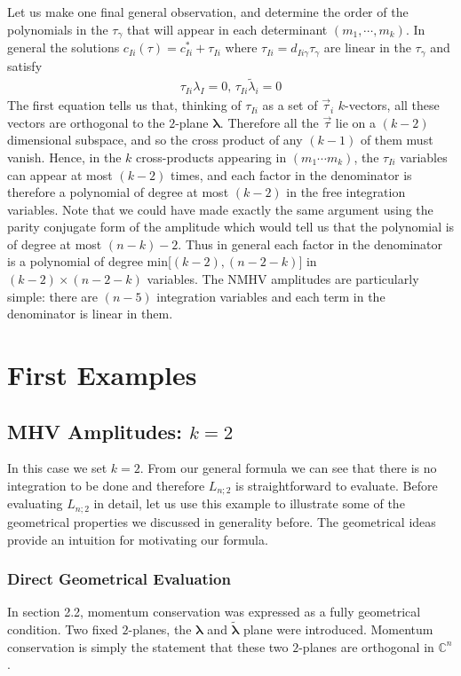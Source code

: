 \documentclass[12pt]{article}
\newcommand{\be}{\begin{eqnarray}}
\newcommand{\ee}{\end{eqnarray}}
\begin{document}
Let us make one final general observation, and determine the order of the polynomials in the $\tau_\gamma$ that will appear in each determinant $(m_1, \cdots, m_k)$. In general the solutions $c_{Ii}(\tau) = c_{Ii}^* + \tau_{Ii}$ where $\tau_{Ii} = d_{Ii\gamma} \tau_\gamma$ are linear in the $\tau_\gamma$ and satisfy
\be
\tau_{Ii} \lambda_I = 0, \, \tau_{Ii} \tilde \lambda_i = 0
\ee
The first equation tells us that, thinking of $\tau_{Ii}$ as a set of $\vec{\tau}_i$ $k$-vectors, all these vectors are orthogonal to the $2$-plane $\boldsymbol{\lambda}$. Therefore all the $\vec{\tau}$ lie on a $(k-2)$ dimensional subspace, and so the cross product of any
$(k-1)$ of them must vanish. Hence, in the $k$ cross-products appearing in $(m_1 \cdots m_k)$, the $\tau_{Ii}$ variables can appear at most $(k-2)$
times, and each factor in the denominator is therefore a polynomial of degree at most $(k-2)$ in the free integration variables.
Note that we could have made exactly the same argument using the parity conjugate form
of the amplitude which would tell us that the polynomial is of degree at most $(n - k) -2$.
Thus in general each factor in the denominator is a polynomial of degree min[$(k-2),(n-2-k)]$ in $(k-2) \times (n - 2 - k)$ variables.
The NMHV amplitudes are particularly simple: there are $(n-5)$ integration variables and
each term in the denominator is linear in them.

\section{First Examples}

\subsection{MHV Amplitudes: $k=2$}

In this case we set $k=2$. From our general formula we can see that there is no integration to be done and therefore $L_{n;2}$ is straightforward to evaluate. Before evaluating $L_{n;2}$ in detail, let us use this example to illustrate some of the geometrical properties we discussed in generality before. The geometrical ideas provide an intuition for motivating our formula.

\subsubsection{Direct Geometrical Evaluation}

In section 2.2, momentum conservation was expressed as a fully geometrical condition. Two fixed $2$-planes, the $\boldsymbol{\lambda}$ and $\boldsymbol{\tilde\lambda}$ plane were introduced. Momentum conservation is simply the statement that these two $2$-planes are orthogonal in $\mathbb{C}^n$.
\end{document}
